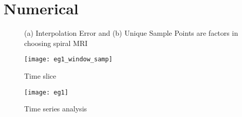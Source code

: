 \section{Numerical}
\label{sec:numerical}


\begin{figure}[h!]
\centering
{}

\caption{(a) Interpolation Error and  (b) Unique Sample Points are factors in choosing spiral MRI}
\label{fig:sample pattern}
\end{figure}

\begin{figure}[h!]
\centering
\texttt{[image: eg1\_window\_samp]}
\caption{Time slice}
\label{fig:sim_eg_timeslice}
\end{figure}

\begin{figure}[h!]
\centering
\texttt{[image: eg1]}
\caption{Time series analysis}
\label{fig:sim_eg_timeseries}
\end{figure}
